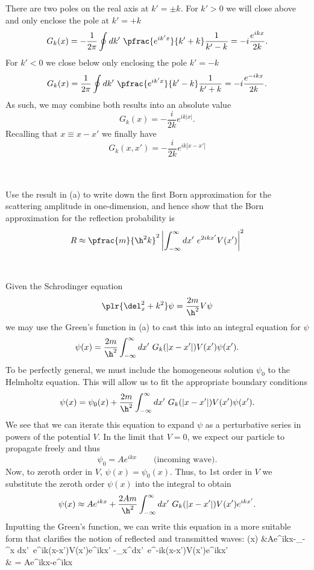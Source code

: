 \documentclass[10pt,letterpaper]{article}
\begin{document}
	There are two poles on the real axis at $k' = \pm k$. For $k'>0$ we will close above and only 
	enclose the pole at $k'=+k$
	\[
		G_k(x) = -\frac{1}{2\pi}\oint dk'\  \pfrac{e^{ik'x}}{k'+k}\frac{1}{k'-k} = -i\frac{e^{ikx}}{2k}.
	\]
	For $k'<0$ we close below only enclosing the pole $k'=-k$
	\[
		G_k(x) = \frac{1}{2\pi}\oint dk'\  \pfrac{e^{ik'x}}{k'-k}\frac{1}{k'+k} = -i\frac{e^{-ikx}}{2k}.
	\]
	As such, we may combine both results into an absolute value 
	\[
		G_k(x) = -\frac{i}{2k}e^{ik|x|}.
	\]
	Recalling that $x\equiv x-x'$ we finally have
	\[
		G_k(x,x')= -\frac{i}{2k}e^{ik|x-x'|}
	\]
	\\
	\\
	
	\item
	Use the result in (a) to write down the first Born approximation for the scattering amplitude in one-dimension,
	and hence show that the Born approximation for the reflection probability is
	\[
		R \approx \pfrac{m}{\h^2 k}^2\left|\int_{-\infty}^{\infty} dx'\ e^{2ikx'}V(x')\right|^2
	\]
	\\
	\\
	Given the Schrodinger equation
	\[
		\plr{\del_x^2+k^2}\psi = \frac{2m}{\h^2} V\psi
	\]
	we may use the Green's function in (a) to cast this into an integral equation for $\psi$
	\[
		\psi(x) = \frac{2m}{\h^2}\int_{-\infty}^\infty dx'\ G_k(|x-x'|)V(x')\psi(x').
	\]
	To be perfectly general, we must include the homogeneous solution $\psi_0$ to the Helmholtz equation. This will
	allow us to fit the appropriate boundary conditions
	\[
		\psi(x) = \psi_0(x) + \frac{2m}{\h^2}\int_{-\infty}^\infty dx'\ G_k(|x-x'|)V(x')\psi(x').
	\]
	We see that we can iterate this equation to expand $\psi$ as a perturbative series in powers of
	the potential $V$. In the limit that $V=0$, we expect our particle to propagate freely and thus
	\[
		\psi_0 = Ae^{ikx}\qquad\text{(incoming wave)}.
	\]
	Now, to zeroth order in $V$, $\psi(x) = \psi_0(x)$. Thus, to 1st order in $V$ we substitute the zeroth order
	$\psi(x)$ into the integral to obtain
	\[
		\psi(x) \approx Ae^{ikx}+\frac{2Am}{\h^2}\int_{-\infty}^\infty dx'\  G_k(|x-x'|)V(x')e^{ikx'}.
	\]
	Inputting the Green's function, we can write this equation in a more suitable form that clarifies the notion of reflected 
	and transmitted waves:
	\ba
		\psi(x) &\approx Ae^{ikx}-\int_{-\infty}^x dx'\ e^{ik(x-x')}V(x')e^{ikx'}
		-\int_{x}^\infty dx'\ e^{-ik(x-x')}V(x')e^{ikx'} \\
		& =  Ae^{ikx}-e^{ikx}
\end{document}

